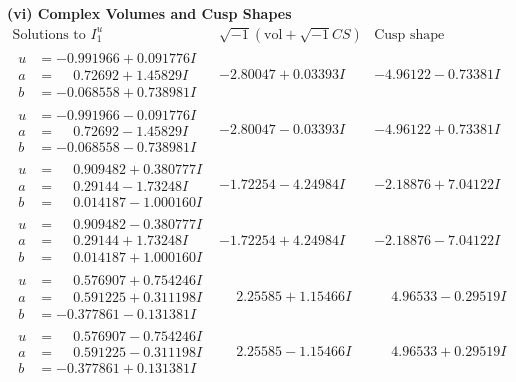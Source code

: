 \documentclass[1p]{elsarticle_modified}
\theoremstyle{definition}
\newcommand{\I}{\sqrt{-1}}
\begin{document}
\newpage\flushleft \textbf{(vi) Complex Volumes and Cusp Shapes}
$$\begin{array}{c|c|c}  
\text{Solutions to }I^u_{1}& \I (\text{vol} + \sqrt{-1}CS) & \text{Cusp shape}\\
 \hline 
\begin{aligned}
u &= -0.991966 + 0.091776 I \\
a &= \phantom{-}0.72692 + 1.45829 I \\
b &= -0.068558 + 0.738981 I\end{aligned}
 & -2.80047 + 0.03393 I & -4.96122 - 0.73381 I \\ \hline\begin{aligned}
u &= -0.991966 - 0.091776 I \\
a &= \phantom{-}0.72692 - 1.45829 I \\
b &= -0.068558 - 0.738981 I\end{aligned}
 & -2.80047 - 0.03393 I & -4.96122 + 0.73381 I \\ \hline\begin{aligned}
u &= \phantom{-}0.909482 + 0.380777 I \\
a &= \phantom{-}0.29144 - 1.73248 I \\
b &= \phantom{-}0.014187 - 1.000160 I\end{aligned}
 & -1.72254 - 4.24984 I & -2.18876 + 7.04122 I \\ \hline\begin{aligned}
u &= \phantom{-}0.909482 - 0.380777 I \\
a &= \phantom{-}0.29144 + 1.73248 I \\
b &= \phantom{-}0.014187 + 1.000160 I\end{aligned}
 & -1.72254 + 4.24984 I & -2.18876 - 7.04122 I \\ \hline\begin{aligned}
u &= \phantom{-}0.576907 + 0.754246 I \\
a &= \phantom{-}0.591225 + 0.311198 I \\
b &= -0.377861 - 0.131381 I\end{aligned}
 & \phantom{-}2.25585 + 1.15466 I & \phantom{-}4.96533 - 0.29519 I \\ \hline\begin{aligned}
u &= \phantom{-}0.576907 - 0.754246 I \\
a &= \phantom{-}0.591225 - 0.311198 I \\
b &= -0.377861 + 0.131381 I\end{aligned}
 & \phantom{-}2.25585 - 1.15466 I & \phantom{-}4.96533 + 0.29519 I \\ \hline\begin{aligned}

\end{aligned}
\end{array}$$
\end{document}

